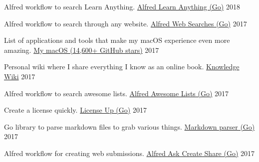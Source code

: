 
\begin{cventries}

  \cventry
    {Alfred workflow to search Learn Anything.}
    {\href{https://github.com/nikitavoloboev/alfred-learn-anything}{Alfred Learn Anything (Go)}}
    {}
    {2018}
    {
    }

    \cventry
    {Alfred workflow to search through any website.}
    {\href{https://github.com/nikitavoloboev/alfred-web-searches}{Alfred Web Searches (Go)}}
    {}
    {2017}
    {
    }

    \cventry
    {List of applications and tools that make my macOS experience even more amazing.}
    {\href{https://github.com/nikitavoloboev/my-mac-os}{My macOS (14,600+ GitHub stars)}}
    {}
    {2017}
    {
    }

    \cventry
    {Personal wiki where I share everything I know as an online book.}
    {\href{https://wiki.nikitavoloboev.xyz}{Knowledge Wiki}}
    {}
    {2017}
    {
    }

    \cventry
    {Alfred workflow to search awesome lists.}
    {\href{https://github.com/nikitavoloboev/alfred-awesome-lists}{Alfred Awesome Lists (Go)}}
    {}
    {2017}
    {
    }

    \cventry
    {Create a license quickly.}
    {\href{https://github.com/nikitavoloboev/license-up}{License Up (Go)}}
    {}
    {2017}
    {
    }

    \cventry
    {Go library to parse markdown files to grab various things.}
    {\href{https://github.com/nikitavoloboev/markdown-parser}{Markdown parser (Go)}}
    {}
    {2017}
    {
    }

    \cventry
    {Alfred workflow for creating web submissions.}
    {\href{https://github.com/nikitavoloboev/alfred-ask-create-share}{Alfred Ask Create Share (Go)}}
    {}
    {2017}
    {
    }

\end{cventries}
